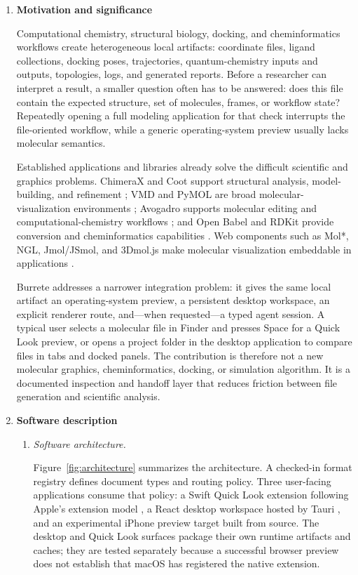 \documentclass[preprint,12pt,a4paper]{elsarticle}
\begin{document}
\begin{enumerate}

\item \textbf{Motivation and significance}

Computational chemistry, structural biology, docking, and cheminformatics
workflows create heterogeneous local artifacts: coordinate files, ligand
collections, docking poses, trajectories, quantum-chemistry inputs and outputs,
topologies, logs, and generated reports. Before a researcher can interpret a
result, a smaller question often has to be answered: does this file contain the
expected structure, set of molecules, frames, or workflow state? Repeatedly
opening a full modeling application for that check interrupts the file-oriented
workflow, while a generic operating-system preview usually lacks molecular
semantics.

Established applications and libraries already solve the difficult scientific
and graphics problems. ChimeraX and Coot support structural analysis,
model-building, and refinement \cite{chimerax,coot}; VMD and PyMOL are broad
molecular-visualization environments \cite{vmd,pymol}; Avogadro supports
molecular editing and computational-chemistry workflows \cite{avogadro}; and
Open Babel and RDKit provide conversion and cheminformatics capabilities
\cite{openbabel,rdkit}. Web components such as Mol*, NGL, Jmol/JSmol, and
3Dmol.js make molecular visualization embeddable in applications
\cite{molstar,ngl,jmol,threedmol}.

Burrete addresses a narrower integration problem: it gives the same local
artifact an operating-system preview, a persistent desktop workspace, an
explicit renderer route, and---when requested---a typed agent session. A typical
user selects a molecular file in Finder and presses Space for a Quick Look
preview, or opens a project folder in the desktop application to compare files
in tabs and docked panels. The contribution is therefore not a new molecular
graphics, cheminformatics, docking, or simulation algorithm. It is a documented
inspection and handoff layer that reduces friction between file generation and
scientific analysis.

\item \textbf{Software description}

\begin{enumerate}

\item \textit{Software architecture.}

Figure~\ref{fig:architecture} summarizes the architecture. A checked-in format
registry defines document types and routing policy. Three user-facing
applications consume that policy: a Swift Quick Look extension following
Apple's extension model \cite{applequicklook}, a React desktop workspace hosted
by Tauri \cite{tauri}, and an experimental iPhone preview target built from
source. The desktop and Quick Look surfaces package their own runtime artifacts
and caches; they are tested separately because a successful browser preview
does not establish that macOS has registered the native extension.


\end{enumerate}
\end{enumerate}
\end{document}
